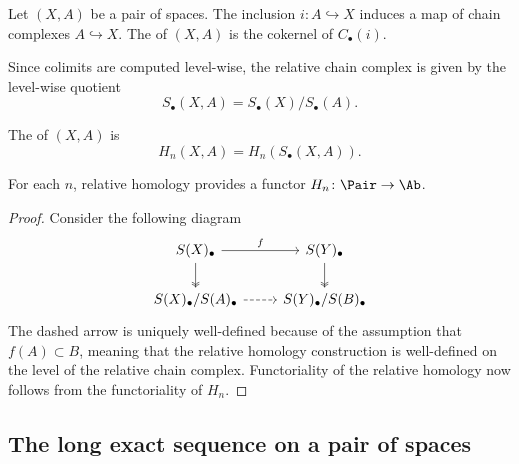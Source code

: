 \documentclass[main.tex]{subfiles}
\begin{document}
\begin{definition}
  \label{def:relative_homology}
  Let $(X, A)$ be a pair of spaces. The inclusion $i\colon A \hookrightarrow X$ induces a map of chain complexes $A \hookrightarrow X$. The  of $(X, A)$ is the cokernel of $C_{\bullet}(i)$.

  Since colimits are computed level-wise, the relative chain complex is given by the level-wise quotient
  \begin{equation*}
    S_{\bullet}(X, A) = S_{\bullet}(X) / S_{\bullet}(A).
  \end{equation*}

  The  of $(X, A)$ is
  \begin{equation*}
    H_{n}(X, A) = H_{n}(S_{\bullet}(X, A)).
  \end{equation*}
\end{definition}

\begin{lemma}
  \label{lemma:relative_homology_functorial}
  For each $n$, relative homology provides a functor $H_{n}\colon \Pair \to \Ab$.
\end{lemma}
\begin{proof}
  Consider the following diagram
  \begin{equation*}
    \begin{tikzcd}
      S(X)_{\bullet}
      \arrow[r, "f"]
      \arrow[d, two heads]
      & S(Y)_{\bullet}
      \arrow[d, two heads]
      \\
      S(X)_{\bullet}/S(A)_{\bullet}
      \arrow[r, dashed]
      & S(Y)_{\bullet}/S(B)_{\bullet}
    \end{tikzcd}
  \end{equation*}
  The dashed arrow is uniquely well-defined because of the assumption that $f(A) \subset B$, meaning that the relative homology construction is well-defined on the level of the relative chain complex. Functoriality of the relative homology now follows from the functoriality of $H_{n}$.
\end{proof}

\subsection{The long exact sequence on a pair of spaces}
\label{ssc:the_long_exact_sequence_on_a_pair_of_spaces}
\end{document}
